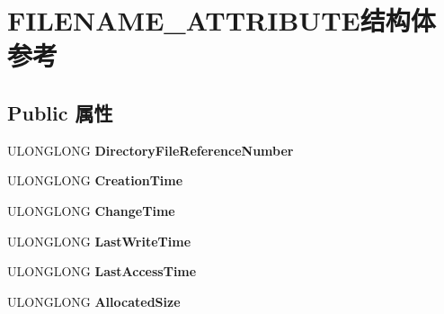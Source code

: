 \hypertarget{struct_f_i_l_e_n_a_m_e___a_t_t_r_i_b_u_t_e}{}\section{F\+I\+L\+E\+N\+A\+M\+E\+\_\+\+A\+T\+T\+R\+I\+B\+U\+T\+E结构体 参考}
\label{struct_f_i_l_e_n_a_m_e___a_t_t_r_i_b_u_t_e}
\subsection*{Public 属性}
\begin{DoxyCompactItemize}
\item 
\mbox{\label{struct_f_i_l_e_n_a_m_e___a_t_t_r_i_b_u_t_e_a26b80f82e1f675b959e0a32ea59077c0}} 
U\+L\+O\+N\+G\+L\+O\+NG {\bfseries Directory\+File\+Reference\+Number}
\item 
\mbox{\label{struct_f_i_l_e_n_a_m_e___a_t_t_r_i_b_u_t_e_ab52af488677c693513c580e3a8a741ba}} 
U\+L\+O\+N\+G\+L\+O\+NG {\bfseries Creation\+Time}
\item 
\mbox{\label{struct_f_i_l_e_n_a_m_e___a_t_t_r_i_b_u_t_e_af6a6fef2096cca0bc2e8e57efc8577be}} 
U\+L\+O\+N\+G\+L\+O\+NG {\bfseries Change\+Time}
\item 
\mbox{\label{struct_f_i_l_e_n_a_m_e___a_t_t_r_i_b_u_t_e_a0d50c3940ace28bb0b5b3086530c02eb}} 
U\+L\+O\+N\+G\+L\+O\+NG {\bfseries Last\+Write\+Time}
\item 
\mbox{\label{struct_f_i_l_e_n_a_m_e___a_t_t_r_i_b_u_t_e_a8ff4665ae62cdae989c916cec57954dc}} 
U\+L\+O\+N\+G\+L\+O\+NG {\bfseries Last\+Access\+Time}
\item 
\mbox{\label{struct_f_i_l_e_n_a_m_e___a_t_t_r_i_b_u_t_e_a73ad42cd979bc188aa0969b6454e5858}} 
U\+L\+O\+N\+G\+L\+O\+NG {\bfseries Allocated\+Size}
\item 
\mbox{\label{struct_f_i_l_e_n_a_m_e___a_t_t_r_i_b_u_t_e_a331c85e9027d1cfd2f827a54b0052d77}} 

\end{DoxyCompactItemize}
